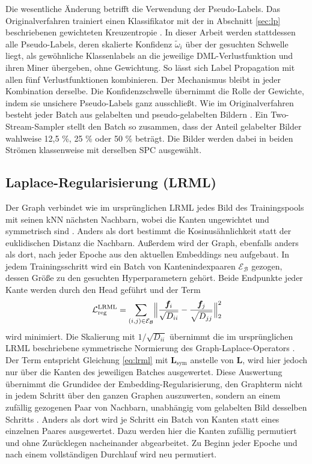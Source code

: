 Die wesentliche Änderung betrifft die Verwendung der Pseudo-Labels. Das Originalverfahren trainiert einen Klassifikator mit der in Abschnitt \ref{sec:lp} beschriebenen gewichteten Kreuzentropie \cite{iscen_label_2019}. In dieser Arbeit werden stattdessen alle Pseudo-Labels, deren skalierte Konfidenz $\tilde\omega_i$ über der gesuchten Schwelle liegt, als gewöhnliche Klassenlabels an die jeweilige \ac{DML}-Verlustfunktion und ihren Miner übergeben, ohne Gewichtung. So lässt sich Label Propagation mit allen fünf Verlustfunktionen kombinieren. Der Mechanismus bleibt in jeder Kombination derselbe. Die Konfidenzschwelle übernimmt die Rolle der Gewichte, indem sie unsichere Pseudo-Labels ganz ausschließt. Wie im Originalverfahren besteht jeder Batch aus gelabelten und pseudo-gelabelten Bildern \cite{iscen_label_2019}. Ein Two-Stream-Sampler stellt den Batch so zusammen, dass der Anteil gelabelter Bilder wahlweise 12,5 \%, 25 \% oder 50 \% beträgt. Die Bilder werden dabei in beiden Strömen klassenweise mit derselben SPC ausgewählt.

\subsection{Laplace-Regularisierung (\acs{LRML})}
\label{sec:m:lrml}

Der Graph verbindet wie im ursprünglichen \ac{LRML} jedes Bild des Trainingspools mit seinen \ac{kNN} nächsten Nachbarn, wobei die Kanten ungewichtet und symmetrisch sind \cite{hoi_semi-supervised_2010}. Anders als dort bestimmt die Kosinusähnlichkeit statt der euklidischen Distanz die Nachbarn. Außerdem wird der Graph, ebenfalls anders als dort, nach jeder Epoche aus den aktuellen Embeddings neu aufgebaut. In jedem Trainingsschritt wird ein Batch von Kantenindexpaaren $\mathcal{E}_{\mathcal{B}}$ gezogen, dessen Größe zu den gesuchten Hyperparametern gehört. Beide Endpunkte jeder Kante werden durch den Head geführt und der Term
\begin{equation}
  \mathcal{L}_{\mathrm{reg}}^{\mathrm{LRML}}=\sum_{(i,j)\in\mathcal{E}_{\mathcal{B}}}\Bigl\lVert\frac{\bm{f}_i}{\sqrt{D_{ii}}}-\frac{\bm{f}_j}{\sqrt{D_{jj}}}\Bigr\rVert_2^2
  \label{eq:m:lrml}
\end{equation}
wird minimiert. Die Skalierung mit $1/\sqrt{D_{ii}}$ übernimmt die im ursprünglichen \ac{LRML} beschriebene symmetrische Normierung des Graph-Laplace-Operators \cite{hoi_semi-supervised_2010}. Der Term entspricht Gleichung \eqref{eq:lrml} mit $\bm{L}_{\mathrm{sym}}$ anstelle von $\bm{L}$, wird hier jedoch nur über die Kanten des jeweiligen Batches ausgewertet. Diese Auswertung übernimmt die Grundidee der Embedding-Regularisierung, den Graphterm nicht in jedem Schritt über den ganzen Graphen auszuwerten, sondern an einem zufällig gezogenen Paar von Nachbarn, unabhängig vom gelabelten Bild desselben Schritts \cite{weston_deep_2012}. Anders als dort wird je Schritt ein Batch von Kanten statt eines einzelnen Paares ausgewertet. Dazu werden hier die Kanten zufällig permutiert und ohne Zurücklegen nacheinander abgearbeitet. Zu Beginn jeder Epoche und nach einem vollständigen Durchlauf wird neu permutiert. 

